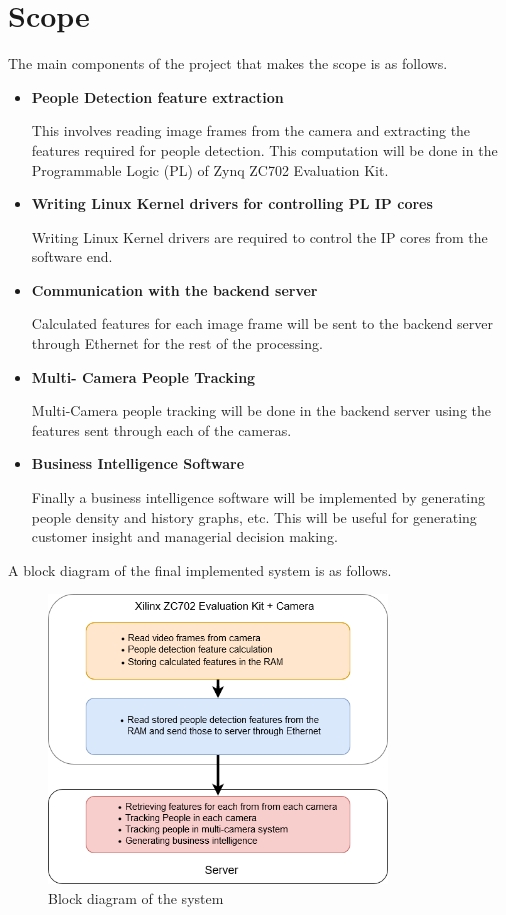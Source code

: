 \documentclass[12pt,a4paper]{report}
\begin{document}
\section{Scope}
The main components of the project that makes the scope is as follows. 
\begin{itemize}
\item{\textbf{People Detection feature extraction}} 
\par This involves reading image frames from the camera and extracting the features required for     people detection. This computation will be done in the Programmable Logic (PL) of Zynq     ZC702 Evaluation Kit.
\item{\textbf{Writing Linux Kernel drivers for controlling PL IP cores}}
\par Writing Linux Kernel drivers are required to control the IP cores from the software end.
\item{\textbf{Communication with the backend server}} 
\par Calculated features for each image frame will be sent to the backend server through Ethernet  for the rest of the processing.
\item{\textbf{Multi- Camera People Tracking}} 
\par Multi-Camera people tracking will be done in the backend server using the features sent through each of the cameras.
\item{\textbf{Business Intelligence Software}} 
\par Finally a business intelligence software will be implemented by generating people density and history graphs, etc. This will be useful for generating customer insight and managerial decision making.
\end{itemize}
A block diagram of the final implemented system is as follows.
\begin{figure}[h]
\includegraphics[width=9cm]{block_diagram.png}
\centering
\caption{Block diagram of the system}
\label{f1}
\end{figure}
\end{document}
